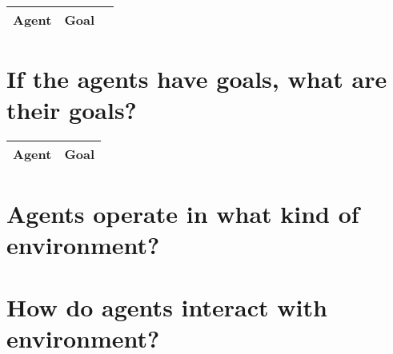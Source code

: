 \documentclass[]{article}
\begin{document}
\begin{tabular}{|l|l|l|} \hline
	Agent&Goal&\\ \hline

\end{tabular}


\section{If the agents have goals, what are their goals?}

\begin{tabular}{|l|l|} \hline
	Agent&Goal\\ \hline

\end{tabular}


\section{Agents operate in what kind of environment?}
\section{How do agents interact with environment?}

\medskip



\end{document}
